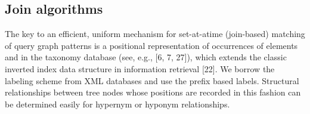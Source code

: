 \documentclass{sig-alternate}
\begin{document}

\subsection{Join algorithms}

The key to an efficient, uniform mechanism for set-at-atime
(join-based) matching of query graph patterns is a positional
representation of occurrences of  elements and in the taxonomy database (see, e.g., [6, 7, 27]),
which extends the classic inverted index data structure in information retrieval [22]. We borrow the labeling scheme from XML databases and use the prefix based labels. Structural relationships between tree nodes whose positions
are recorded in this fashion can be determined easily for hypernym or hyponym relationships.
\end{document}
